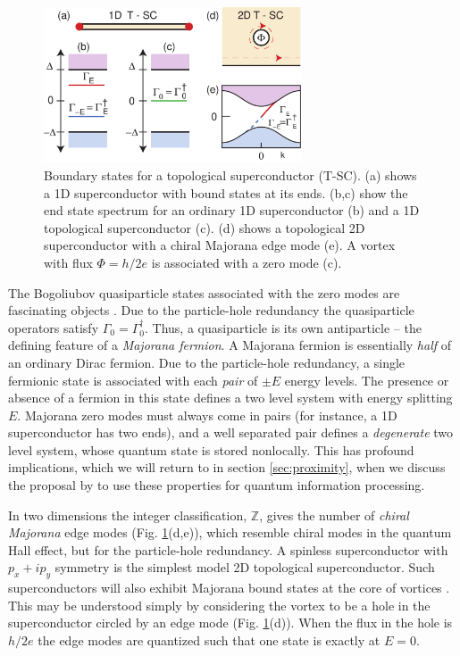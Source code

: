 \documentclass[twocolumn,floatfix,showpacs,rmp,aps]{revtex4}
\begin{document}
\begin{figure}
\includegraphics[width=3in]{Fig4}
\caption{Boundary states for a topological superconductor (T-SC).  (a) shows a 1D superconductor
with bound states at its ends.  (b,c) show the end state spectrum for an ordinary 1D superconductor
(b) and a 1D topological superconductor (c).  (d) shows a topological 2D superconductor
with a chiral Majorana edge mode (e).  A vortex with flux $\Phi = h/2e$ is associated
with a zero mode (c).}
\label{fig:scedge}
\end{figure}

The Bogoliubov quasiparticle states associated with the zero modes are
fascinating objects \cite{nayak08,readgreen00,stern04,ivanov01,kitaev00}.  Due to the particle-hole redundancy
the quasiparticle operators satisfy $\Gamma_0 = \Gamma_0^\dagger$.
Thus, a quasiparticle is its own antiparticle -- the defining
feature of a {\it Majorana fermion}.
A Majorana fermion is essentially {\it half} of an ordinary
Dirac fermion.  Due to the particle-hole redundancy, a single fermionic state
is associated with each {\it pair} of $\pm E$ energy levels.  The presence or absence
of a fermion in this state defines a two level system with energy splitting $E$.
Majorana zero modes
must always come in pairs (for instance, a 1D superconductor has two ends), and a
well separated pair
defines a {\it degenerate} two level system, whose quantum state is stored nonlocally.
This has profound implications, which we will return to in section
\ref{sec:proximity}, when we discuss the proposal by \textcite{kitaev03} to use these
properties for quantum information processing.

In two dimensions the integer classification, $\mathbb{Z}$,
gives the number of {\it chiral Majorana} edge
modes (Fig. \ref{fig:scedge}(d,e)), which resemble chiral modes in the quantum Hall effect, but for
the particle-hole redundancy.  A spinless superconductor with $p_x+ip_y$ symmetry
is the simplest model 2D topological superconductor.
Such superconductors will also exhibit Majorana bound states at the core of vortices
\cite{caroli64,volovik99,readgreen00}.
This may be understood simply by considering the vortex to be a hole
in the superconductor circled by an edge mode (Fig. \ref{fig:scedge}(d)).
When the flux in the
hole is $h/2e$ the edge modes are quantized such that one state is exactly
at $E=0$.
\end{document}
